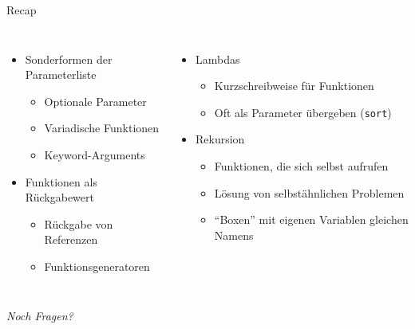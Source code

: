 
\begin{frame}[t,plain]
\titlepage
\end{frame}


\begin{frame}{Recap}
%
\begin{columns}[T]
\begin{itemize}
\item Sonderformen der Parameterliste
	\begin{itemize}
	\item Optionale Parameter
	\item Variadische Funktionen
	\item Keyword-Arguments
	\end{itemize}
\item Funktionen als Rückgabewert
	\begin{itemize}
	\item Rückgabe von Referenzen
	\item Funktionsgeneratoren
	\end{itemize}
\end{itemize}
%
\begin{itemize}
\item Lambdas
	\begin{itemize}
	\item Kurzschreibweise für Funktionen
	\item Oft als Parameter übergeben (\thus \texttt{sort})
	\end{itemize}
\item Rekursion
	\begin{itemize}
	\item Funktionen, die sich selbst aufrufen
	\item Lösung von selbstähnlichen Problemen
	\item \enquote{Boxen} mit eigenen Variablen gleichen Namens
	\end{itemize}
\end{itemize}

\end{columns}
%
\begin{center}
	\emph{Noch Fragen?}
\end{center}
%
\end{frame}

